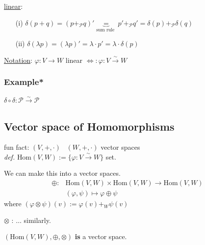 \documentclass[10pt]{amsart}
\begin{document}
\begin{multicols*}{2}
\underline{linear}: \begin{enumerate}
	\item[(i)] $\delta(p+q) = (p+_{\mathcal{P}} q)' \underbrace{=}_{\text{sum rule }} p' +_{\mathcal{P}} q' = \delta(p) +_{\mathcal{P}} \delta(q) $
	\item[(ii)] $\delta(\lambda p) = (\lambda p)' = \lambda \cdot p'= \lambda \cdot \delta(p)$
\end{enumerate}

\underline{Notation}: $\varphi : V \to W$ linear $\Longleftrightarrow : \varphi : V \xrightarrow{ \sim } W$


\subsubsection{Example*} $\delta \circ \delta : \mathcal{P} \xrightarrow{ \sim } \mathcal{P}$

\subsection{Vector space of Homomorphisms}

fun fact: $(V,+,\cdot)$ \, $(W,+,\cdot)$ vector spaces \\
\qquad \emph{def.} $\text{Hom}(V,W) := \lbrace \varphi : V \xrightarrow{ \sim } W \rbrace$  \qquad set.

We can make this into a vector spaces. 
\[
\begin{aligned}
\oplus  :  &  \text{Hom}(V,W) \times \text{Hom}(V,W) \to \text{Hom}(V,W) \\ 
& (\varphi, \psi) \mapsto \varphi \oplus \psi
\end{aligned}
\]
where $(\varphi \otimes \psi )(v) := \varphi(v) +_W \psi(v)$

$\otimes$ : $\dots$ similarly.  

$(\text{Hom}(V,W), \oplus, \otimes)$ \textbf{is} a vector space.


\end{multicols*}
\end{document}
